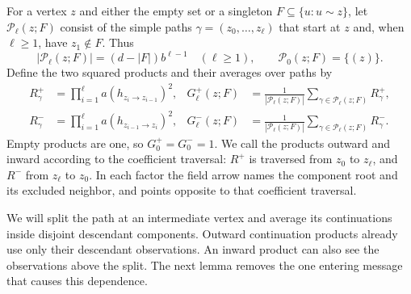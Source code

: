 For a vertex $z$ and either the empty set or a singleton
$F\subseteq\{u:u\sim z\}$, let $\mathcal P_\ell(z;F)$ consist of the
simple paths $\gamma=(z_0,\ldots,z_\ell)$ that start at $z$ and, when
$\ell\ge1$, have $z_1\notin F$.  Thus
\[
 |\mathcal P_\ell(z;F)|=(d-|F|)b^{\ell-1}\quad(\ell\ge1),
 \qquad \mathcal P_0(z;F)=\{(z)\}.
\]
Define the two squared products and their averages over paths by
\begin{align*}
 R^+_\gamma
  &=\prod_{i=1}^{\ell}a(h_{z_i\to z_{i-1}})^2,
 &G^+_\ell(z;F)
  &=\frac1{|\mathcal P_\ell(z;F)|}
       \sum_{\gamma\in\mathcal P_\ell(z;F)}R^+_\gamma,\\
 R^-_\gamma
  &=\prod_{i=1}^{\ell}a(h_{z_{i-1}\to z_i})^2,
 &G^-_\ell(z;F)
  &=\frac1{|\mathcal P_\ell(z;F)|}
       \sum_{\gamma\in\mathcal P_\ell(z;F)}R^-_\gamma.
\end{align*}
Empty products are one, so $G^+_0=G^-_0=1$.  We call the products
outward and inward according to the coefficient traversal: $R^+$ is
traversed from $z_0$ to $z_\ell$, and $R^-$ from $z_\ell$ to $z_0$.
In each factor the field arrow names the component root and its
excluded neighbor, and points opposite to that coefficient traversal.

We will split the path at an intermediate vertex and average its
continuations inside disjoint descendant components.  Outward
continuation products already use only their descendant observations.
An inward product can also see the observations above the split.  The
next lemma removes the one entering message that causes this dependence.

